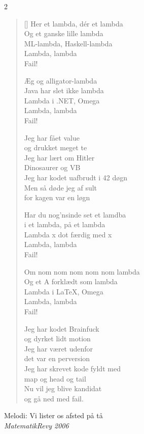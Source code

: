 \begin{multicols}2
\settowidth{\versewidth}{Jeg har skrevet kode fyldt med}
\begin{verse}[\versewidth]
Her et lambda, dér et lambda\\
Og et ganske lille lambda\\
ML-lambda, Haskell-lambda\\
Lambda, lambda\\
Fail!

Æg og alligator-lambda\\
Java har slet ikke lambda\\
Lambda i .NET, Omega\\
Lambda, lambda\\
Fail!

Jeg har fået value\\
og drukket meget te\\
Jeg har lært om Hitler\\
Dinosaurer og VB\\
Jeg har kodet uafbrudt i 42 døgn\\
Men så døde jeg af sult\\
for kagen var en løgn
\columnbreak

Har du nog'nsinde set et lamdba\\
i et lambda, på et lambda\\
Lambda x dot færdig med x\\
Lambda, lambda\\
Fail!

Om nom nom nom nom nom lambda\\
Og et A forklædt som lambda\\
Lambda i \LaTeX, Omega\\
Lambda, lambda\\
Fail!

Jeg har kodet Brainfuck\\
og dyrket lidt motion\\
Jeg har været udenfor\\
det var en perversion\\
Jeg har skrevet kode fyldt med\\
map og head og tail\\
Nu vil jeg blive kandidat\\
og gå ned med fail.
\end{verse}
\end{multicols}


{Melodi: Vi lister os afsted på tå}\\[.2em]
{\small\itshape MatematikRevy 2006}

